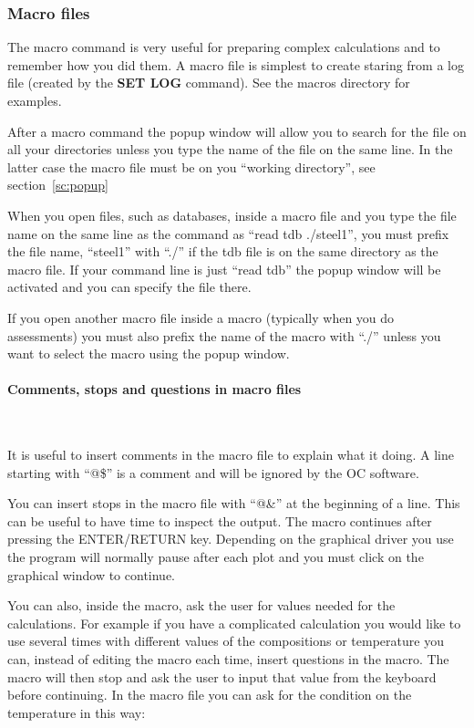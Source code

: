 \documentclass[11pt]{article}
\newcommand{\subsubsubsection}[1]{\paragraph{#1}\mbox{}\\}
\begin{document}
\subsubsection{Macro files}\label{sc:macro}

The macro command is very useful for preparing complex calculations
and to remember how you did them.  A macro file is simplest to create
staring from a log file (created by the {\bf SET LOG} command).  See the
macros directory for examples.

After a macro command the popup window will allow you to search for
the file on all your directories unless you type the name of the
file on the same line.  In the latter case the macro file must be
on you ``working directory'', see section~\ref{sc:popup}

When you open files, such as databases, inside a macro file and you
type the file name on the same line as the command as ``read tdb
./steel1'', you must prefix the file name, ``steel1'' with ``./'' if
the tdb file is on the same directory as the macro file.  If your
command line is just ``read tdb'' the popup window will be activated
and you can specify the file there.

If you open another macro file inside a macro (typically when you do
assessments) you must also prefix the name of the macro with ``./''
unless you want to select the macro using the popup window.

\hypertarget{Macro comments}{}
\subsubsubsection{Comments, stops and questions in macro files}\label{sc:macroadd}

It is useful to insert comments in the macro file to explain what it
doing.  A line starting with ``@\$'' is a comment and will be ignored
by the OC software.

You can insert stops in the macro file with ``@\&'' at the beginning
of a line.  This can be useful to have time to inspect the output.
The macro continues after pressing the ENTER/RETURN key.  Depending on
the graphical driver you use the program will normally pause after
each plot and you must click on the graphical window to continue.

You can also, inside the macro, ask the user for values needed for the
calculations.  For example if you have a complicated calculation you
would like to use several times with different values of the
compositions or temperature you can, instead of editing the macro each
time, insert questions in the macro.  The macro will then stop and ask
the user to input that value from the keyboard before continuing.  In
the macro file you can ask for the condition on the temperature in
this way:
\end{document}
